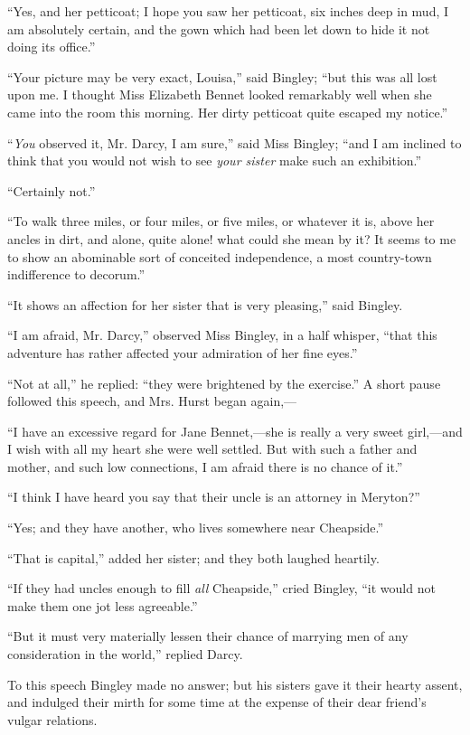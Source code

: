 \documentclass[12pt]{book}
\begin{document}
``Yes, and her petticoat; I hope you saw her petticoat, six inches deep in mud, I am absolutely certain, and the gown which had been let down to hide it not doing its office.''

``Your picture may be very exact, Louisa,'' said Bingley; ``but this was all lost upon me. I thought Miss Elizabeth Bennet looked remarkably well when she came into the room this morning. Her dirty petticoat quite escaped my notice.''

``\textit{You} observed it, Mr. Darcy, I am sure,'' said Miss Bingley; ``and I am inclined to think that you would not wish to see \textit{your sister} make such an exhibition.''

``Certainly not.''

``To walk three miles, or four miles, or five miles, or whatever it is, above her ancles in dirt, and alone, quite alone! what could she mean by it? It seems to me to show an abominable sort of conceited independence, a most country-town indifference to decorum.''

``It shows an affection for her sister that is very pleasing,'' said Bingley.

``I am afraid, Mr. Darcy,'' observed Miss Bingley, in a half whisper, ``that this adventure has rather affected your admiration of her fine eyes.''

``Not at all,'' he replied: ``they were brightened by the exercise.'' A short pause followed this speech, and Mrs. Hurst began again,---

``I have an excessive regard for Jane Bennet,---she is really a very sweet girl,---and I wish with all my heart she were well settled. But with such a father and mother, and such low connections, I am afraid there is no chance of it.''

``I think I have heard you say that their uncle is an attorney in Meryton?''

``Yes; and they have another, who lives somewhere near Cheapside.''

``That is capital,'' added her sister; and they both laughed heartily.

``If they had uncles enough to fill \textit{all} Cheapside,'' cried Bingley, ``it would not make them one jot less agreeable.''

``But it must very materially lessen their chance of marrying men of any consideration in the world,'' replied Darcy.

To this speech Bingley made no answer; but his sisters gave it their hearty assent, and indulged their mirth for some time at the expense of their dear friend's vulgar relations.
\end{document}
